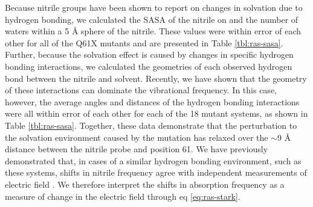 Because nitrile groups have been shown to report on changes in solvation due to hydrogen bonding, we calculated the SASA of the nitrile on \RalBSCN{} and the number of waters within a 5 \si{\angstrom} sphere of the nitrile. 
These values were within error of each other for all of the Q61X mutants and are presented in Table \ref{tbl:ras-sasa}. 
Further, because the solvation effect is caused by changes in specific hydrogen bonding interactions\cite{Choi2008}, we calculated the geometries of each observed hydrogen bond between the nitrile and solvent. 
Recently, we have shown that the geometry of these interactions can dominate the vibrational frequency\cite{First2018}.
In this case, however, the average angles and distances of the hydrogen bonding interactions were all within error of each other for each of the 18 mutant systems, as shown in Table \ref{tbl:ras-sasa}. 
Together, these data demonstrate that the perturbation to the solvation environment caused by the mutation has relaxed over the $\sim$9 \si{\angstrom} distance between the nitrile probe and position 61. 
We have previously demonstrated that, in cases of a similar hydrogen bonding environment, such as these systems, shifts in nitrile frequency agree with independent measurements of electric field \cite{Slocum2016, Slocum2017}.
We therefore interpret the shifts in absorption frequency as a measure of change in the electric field through eq \ref{eq:ras-stark}.

